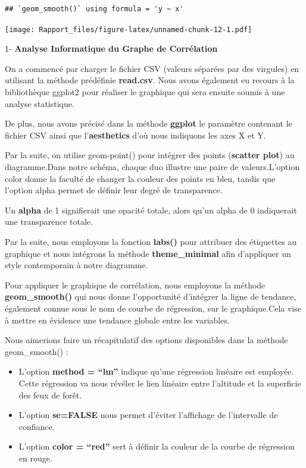 \documentclass[
]{article}
\begin{document}
\begin{verbatim}
## `geom_smooth()` using formula = 'y ~ x'
\end{verbatim}

\texttt{[image: Rapport\_files/figure-latex/unnamed-chunk-12-1.pdf]}

1- \textbf{Analyse Informatique du Graphe de Corrélation }

On a commencé par charger le fichier CSV (valeurs séparées par des
virgules) en utilisant la méthode prédéfinie \textbf{read.csv}. Nous
avons également eu recours à la bibliothèque ggplot2 pour réaliser le
graphique qui sera ensuite soumis à une analyse statistique.

De plus, nous avons précisé dans la méthode \textbf{ggplot} le paramètre
contenant le fichier CSV ainsi que l'\textbf{aesthetics} d'où nous
indiquons les axes X et Y.

Par la suite, on utilise geom-point() pour intégrer des points
(\textbf{scatter plot}) au diagramme.Dans notre schéma, chaque duo
illustre une paire de valeurs.L'option color donne la faculté de changer
la couleur des points en bleu, tandis que l'option alpha permet de
définir leur degré de transparence.

Un \textbf{alpha} de 1 signifierait une opacité totale, alors qu'un
alpha de 0 indiquerait une transparence totale.

Par la suite, nous employons la fonction \textbf{labs()} pour attribuer
des étiquettes au graphique et nous intégrons la méthode
\textbf{theme\_minimal} afin d'appliquer un style contemporain à notre
diagramme.

Pour appliquer le graphique de corrélation, nous employons la méthode
\textbf{geom\_smooth()} qui nous donne l'opportunité d'intégrer la ligne
de tendance, également connue sous le nom de courbe de régression, sur
le graphique.Cela vise à mettre en évidence une tendance globale entre
les variables.

Nous aimerions faire un récapitulatif des options disponibles dans la
méthode geom\_smooth() :

\begin{itemize}
\item
  L'option \textbf{method = ``lm''} indique qu'une régression linéaire
  est employée. Cette régression va nous révéler le lien linéaire entre
  l'altitude et la superficie des feux de forêt.
\item
  L'option \textbf{se=FALSE} nous permet d'éviter l'affichage de
  l'intervalle de confiance.
\item
  L'option \textbf{color = ``red''} sert à définir la couleur de la
  courbe de régression en rouge.
\end{itemize}
\end{document}
